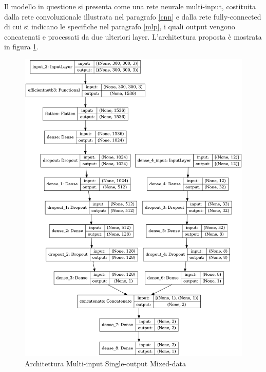     Il modello in questione si presenta come una rete neurale multi-input, costituita dalla rete convoluzionale illustrata nel paragrafo \ref{cnn} e dalla rete fully-connected di cui si
    indicano le specifiche nel paragrafo \ref{mlp}, i quali output vengono concatenati e processati da due ulteriori layer.
    L'architettura proposta è mostrata in figura \ref{fig:model}.
        \begin{figure}[H]
            \centering
            \includegraphics[scale=0.35]{Plot/Model-Plot.png}
            \caption{Architettura Multi-input Single-output Mixed-data}
            \label{fig:model}
        \end{figure}

